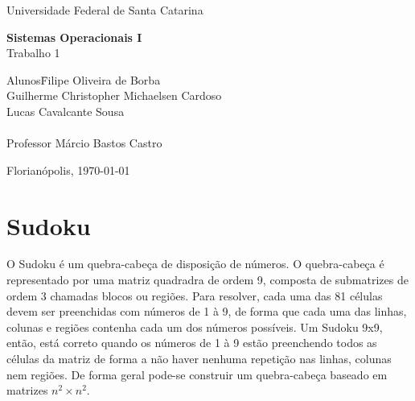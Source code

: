 \documentclass[a4paper, 12pt]{article}
\begin{document}
\begin{titlepage}
    \begin{center}
        \huge{Universidade Federal de Santa Catarina}

        \vspace{10pt}

        \vspace{85pt}

        \textbf{\LARGE{Sistemas Operacionais I}}
        \large{\\Trabalho 1}
        \vspace{160pt}

    \end{center}

    \begin{flushleft}
        \begin{tabbing}
            Alunos\qquad\qquad\=
            Filipe Oliveira de Borba\\
            \>Guilherme Christopher Michaelsen Cardoso\\
            \>Lucas Cavalcante Sousa\\\\
            Professor\> Márcio Bastos Castro \\
        \end{tabbing}
    \end{flushleft}

    \begin{center}
        \vspace{\fill}
        Florianópolis, \today
    \end{center}
\end{titlepage}


\newpage
\tableofcontents
\thispagestyle{empty}


\newpage
{}

\section{Sudoku}
O Sudoku é um quebra-cabeça de disposição de números. O quebra-cabeça é 
representado por uma matriz quadradra de ordem 9, composta de submatrizes de 
ordem 3 chamadas blocos ou regiões. Para resolver, cada uma das 81 células 
devem ser preenchidas com números de 1 à 9, de forma que cada uma das linhas, 
colunas e regiões contenha cada um dos números possíveis. Um Sudoku 9x9, então, 
está correto quando os números de 1 à 9 estão preenchendo todos as células da 
matriz de forma a não haver nenhuma repetição nas linhas, colunas nem regiões.
De forma geral pode-se construir um quebra-cabeça baseado em matrizes 
$n^2 \times n^2$.
\end{document}
